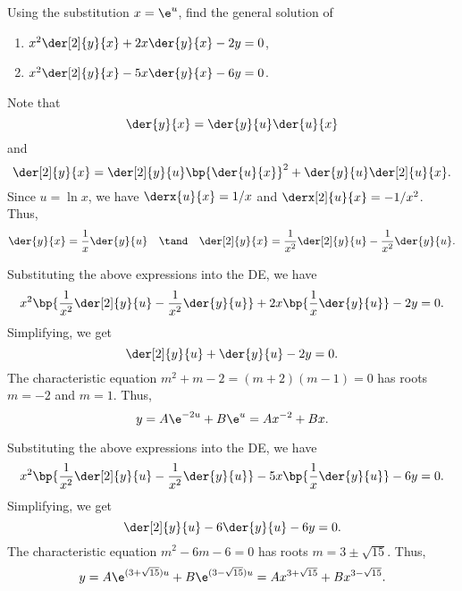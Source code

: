 \begin{problem}
    Using the substitution $x= \e^u$, find the general solution of
    \begin{enumerate}
        \item $x^2 \der[2]{y}{x} + 2x \der{y}{x} - 2y = 0$,
        \item $x^2 \der[2]{y}{x} - 5x \der{y}{x} - 6y = 0$.
    \end{enumerate}
\end{problem}
\begin{solution}
    Note that \[\der{y}{x} = \der{y}{u} \der{u}{x}\] and \[\der[2]{y}{x} = \der[2]{y}{u} \bp{\der{u}{x}}^2 + \der{y}{u} \der[2]{u}{x}.\] Since $u = \ln x$, we have $\derx{u}{x} = 1/x$ and $\derx[2]{u}{x} = -1/x^2$. Thus, \[\der{y}{x} = \frac1x \der{y}{u} \quad \tand \quad \der[2]{y}{x} = \frac1{x^2} \der[2]{y}{u} - \frac1{x^2} \der{y}{u}.\]

    \begin{ppart}
        Substituting the above expressions into the DE, we have \[x^2 \bp{\frac1{x^2} \der[2]{y}{u} - \frac1{x^2} \der{y}{u}} + 2x \bp{\frac1x \der{y}{u}} - 2y = 0.\] Simplifying, we get \[\der[2]{y}{u} + \der{y}{u} - 2y = 0.\] The characteristic equation $m^2 + m - 2 = (m+2)(m-1) = 0$ has roots $m = -2$ and $m = 1$. Thus, \[y = A\e^{-2u} + B\e^u = Ax^{-2} + Bx.\]
    \end{ppart}
    \begin{ppart}
        Substituting the above expressions into the DE, we have \[x^2 \bp{\frac1{x^2} \der[2]{y}{u} - \frac1{x^2} \der{y}{u}} - 5x \bp{\frac1x \der{y}{u}} - 6y = 0.\] Simplifying, we get \[\der[2]{y}{u} - 6 \der{y}{u} - 6y = 0.\] The characteristic equation $m^2 - 6m - 6 = 0$ has roots $m = 3 \pm \sqrt{15}$. Thus, \[y = A\e^{(3 + \sqrt{15}) u} + B\e^{(3 - \sqrt{15}) u} = Ax^{3+\sqrt{15}} + Bx^{3 - \sqrt{15}}.\]
    \end{ppart}
\end{solution}

